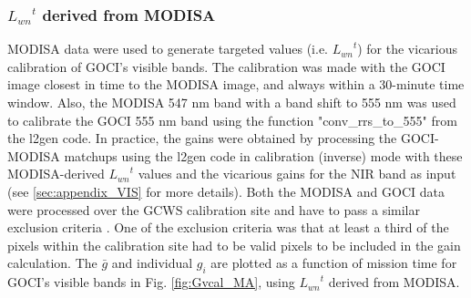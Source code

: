 \documentclass[10pt]{article}
\begin{document}
\subsubsection{${L_{wn}}^t$ derived from MODISA}

MODISA data were used to generate targeted values (i.e. ${L_{wn}}^t$) for the vicarious calibration of GOCI's visible bands. The calibration was made with the GOCI image closest in time to the MODISA image, and always within a 30-minute time window. Also, the MODISA 547 nm band with a band shift to 555 nm was used to calibrate the GOCI 555 nm band using the function "conv\_rrs\_to\_555" from the l2gen code. In practice, the gains were obtained by processing the GOCI-MODISA matchups using the l2gen code in calibration (inverse) mode with these MODISA-derived ${L_{wn}}^t$ values and the vicarious gains for the NIR band as input (see \autoref{sec:appendix_VIS} for more details). Both the MODISA and GOCI data were processed over the GCWS calibration site and have to pass a similar exclusion criteria \cite{Bailey2006}. One of the exclusion criteria was that at least a third of the pixels within the calibration site had to be valid pixels to be included in the gain calculation. The $\bar{g}$ and individual $g_i$ are plotted as a function of mission time for GOCI's visible bands in Fig. \ref{fig:Gvcal_MA}, using ${L_{wn}}^t$ derived from MODISA. 

\end{document}
